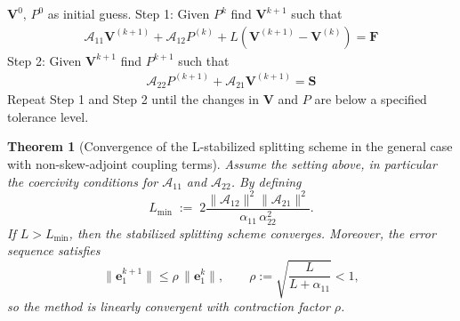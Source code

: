\documentclass[pdflatex,sn-mathphys-num]{sn-jnl}
\theoremstyle{thmstyleone}%
\newtheorem{theorem}{Theorem}%
\theoremstyle{thmstyletwo}%
\theoremstyle{thmstylethree}%
\theoremstyle{definition}
\begin{document}
	\begin{algorithm}[H]
		\caption{Iterative splitting scheme }\label{alg: iterative}
		\begin{algorithmic}
			\Require $\boldsymbol{V}^{0},\, P^{0}$ as initial guess. %
			\State Step 1: Given $P^{k}$ find $\boldsymbol{V}^{k+1}$ such that
			\begin{align*}
				\mathcal{A}_{11} \mathbf{V}^{(k+1)} + 
				\mathcal{A}_{12} P^{(k)}  + 
				L\left( \mathbf{V}^{(k+1)} - \mathbf{V}^{(k)}\right)
				= \mathbf{F}  
			\end{align*}	
			\State Step 2: Given $\boldsymbol{V}^{k+1}$ find $P^{k+1}$ such that
			\begin{align*}
				\mathcal{A}_{22} P^{(k+1)} + 
				\mathcal{A}_{21} \mathbf{V}^{(k+1)} = \mathbf{S}
			\end{align*}
			\State Repeat Step 1 and Step 2 until the changes in $\boldsymbol{V}$ and $P$ are below a specified tolerance level.
			\EndFor
		\end{algorithmic}
	\end{algorithm}
	
	
	
	
	
	
	\begin{theorem}[Convergence of the L-stabilized splitting scheme in the general case with non-skew-adjoint coupling terms]\label{thm: main theorem}
		Assume the setting above, in particular the coercivity conditions for $\mathcal{A}_{11}$ and $\mathcal{A}_{22}$. By defining
		\begin{equation}\label{eq: Lmin}
			L_{\min} \;:=\; 2\frac{\|\mathcal{A}_{12}\|^2 \|\mathcal{A}_{21}\|^2}{\alpha_{11}\,\alpha_{22}^2}.
		\end{equation}
		If $L > L_{\min}$, then the stabilized splitting scheme converges. Moreover, the error sequence satisfies
		\[
		\|\mathbf{e}_1^{k+1}\| \le \rho \,\|\mathbf{e}_1^{k}\|,
		\qquad
		\rho := \sqrt{\frac{L}{L+\alpha_{11}}} < 1,
		\]
		so the method is linearly convergent with contraction factor $\rho$. 
	\end{theorem}
	
	
	
\end{document}
